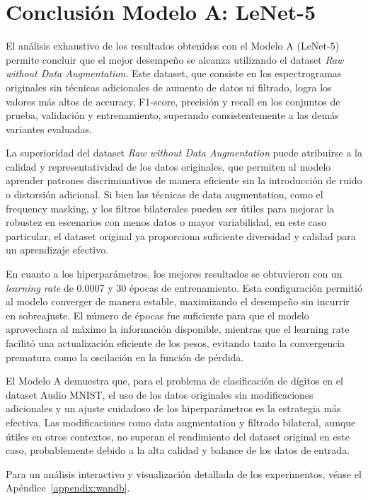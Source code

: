 \documentclass[conference]{IEEEtran}
\begin{document}
\section{Conclusión Modelo A: LeNet-5}

El análisis exhaustivo de los resultados obtenidos con el Modelo A (LeNet-5) permite concluir que el mejor desempeño se alcanza utilizando el dataset \textit{Raw without Data Augmentation}. Este dataset, que consiste en los espectrogramas originales sin técnicas adicionales de aumento de datos ni filtrado, logra los valores más altos de accuracy, F1-score, precisión y recall en los conjuntos de prueba, validación y entrenamiento, superando consistentemente a las demás variantes evaluadas.

La superioridad del dataset \textit{Raw without Data Augmentation} puede atribuirse a la calidad y representatividad de los datos originales, que permiten al modelo aprender patrones discriminativos de manera eficiente sin la introducción de ruido o distorsión adicional. Si bien las técnicas de data augmentation, como el frequency masking, y los filtros bilaterales pueden ser útiles para mejorar la robustez en escenarios con menos datos o mayor variabilidad, en este caso particular, el dataset original ya proporciona suficiente diversidad y calidad para un aprendizaje efectivo.

En cuanto a los hiperparámetros, los mejores resultados se obtuvieron con un \textit{learning rate} de 0.0007 y 30 épocas de entrenamiento. Esta configuración permitió al modelo converger de manera estable, maximizando el desempeño sin incurrir en sobreajuste. El número de épocas fue suficiente para que el modelo aprovechara al máximo la información disponible, mientras que el learning rate facilitó una actualización eficiente de los pesos, evitando tanto la convergencia prematura como la oscilación en la función de pérdida.

El Modelo A demuestra que, para el problema de clasificación de dígitos en el dataset Audio MNIST, el uso de los datos originales sin modificaciones adicionales y un ajuste cuidadoso de los hiperparámetros es la estrategia más efectiva. Las modificaciones como data augmentation y filtrado bilateral, aunque útiles en otros contextos, no superan el rendimiento del dataset original en este caso, probablemente debido a la alta calidad y balance de los datos de entrada.

Para un análisis interactivo y visualización detallada de los experimentos, véase el Apéndice~\ref{appendix:wandb}.
\end{document}
